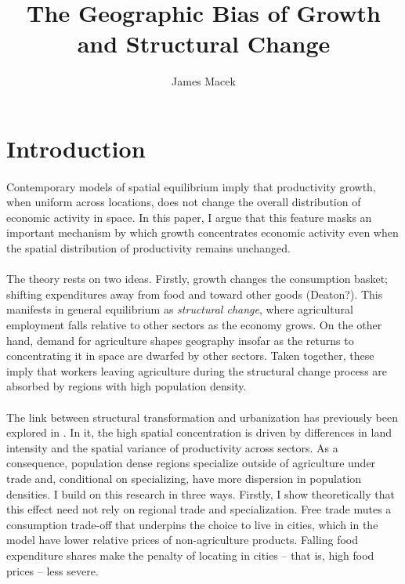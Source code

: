 \documentclass[]{article}
\title{The Geographic Bias of Growth and Structural Change}
\author{James Macek}
\begin{document}
\maketitle

\begin{abstract}


\end{abstract}

\newpage
\section{Introduction}

\paragraph*{}
Contemporary models of spatial equilibrium imply that productivity growth, when uniform across locations, does not change the overall distribution of economic activity in space. In this paper, I argue that this
 feature masks an important mechanism by which growth concentrates economic activity even when the spatial distribution of productivity remains unchanged. 
\paragraph*{}
The theory rests on two ideas. Firstly, growth changes the consumption basket; shifting expenditures away from food and toward other goods (Deaton?). This manifests in general equilibrium as \textit{structural change}, where agricultural employment falls relative to other sectors as the economy grows. On the other hand, demand for agriculture shapes geography insofar as the returns to concentrating it in space are dwarfed by other sectors. Taken together, these imply that workers leaving agriculture during the structural change process are absorbed by regions with high population density. 
\paragraph*{}
The link between structural transformation and urbanization has previously been explored in \citet{urbstruct}. In it, the high spatial concentration is driven by differences in land intensity and the spatial variance of productivity across sectors. As a consequence, population dense regions specialize outside of agriculture under trade and, conditional on specializing, have more dispersion in population densities. I build on this research in three ways. Firstly, I show theoretically that this effect need not rely on regional trade and specialization. Free trade mutes a consumption trade-off that underpins
 the choice to live in cities, which in the model have lower relative prices of non-agriculture products. Falling food expenditure shares make the penalty of locating in cities -- that is, high food prices -- less severe. 
\end{document}
